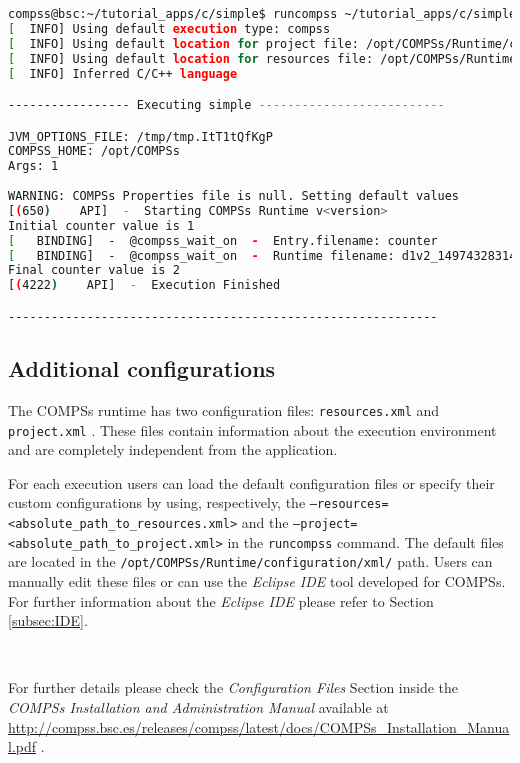 \begin{lstlisting}[language=bash]
compss@bsc:~/tutorial_apps/c/simple$ runcompss ~/tutorial_apps/c/simple/master/simple 1
[  INFO] Using default execution type: compss
[  INFO] Using default location for project file: /opt/COMPSs/Runtime/configuration/xml/projects/default_project.xml
[  INFO] Using default location for resources file: /opt/COMPSs/Runtime/configuration/xml/resources/default_resources.xml
[  INFO] Inferred C/C++ language

----------------- Executing simple --------------------------

JVM_OPTIONS_FILE: /tmp/tmp.ItT1tQfKgP
COMPSS_HOME: /opt/COMPSs
Args: 1
 
WARNING: COMPSs Properties file is null. Setting default values
[(650)    API]  -  Starting COMPSs Runtime v<version>
Initial counter value is 1
[   BINDING]  -  @compss_wait_on  -  Entry.filename: counter
[   BINDING]  -  @compss_wait_on  -  Runtime filename: d1v2_1497432831496.IT
Final counter value is 2
[(4222)    API]  -  Execution Finished

------------------------------------------------------------
\end{lstlisting}


\subsection{Additional configurations}

The COMPSs runtime has two configuration files: \texttt{resources.xml} and \texttt{project.xml} . 
These files contain information about the execution environment and are completely independent from the application.

For each execution users can load the default configuration files or specify their custom configurations 
by using, respectively, the \texttt{--resources=<absolute\_path\_to\_resources.xml>} and the
\texttt{--project=<absolute\_path\_to\_project.xml>} in the \texttt{runcompss} command. The default files are located 
in the \texttt{/opt/COMPSs/Runtime/configuration/xml/} path. 
Users can manually edit these files or can use the \textit{Eclipse IDE} tool developed for COMPSs. For further 
information about the \textit{Eclipse IDE} please refer to Section \ref{subsec:IDE}. 

~\newline

For further details please check the \textit{Configuration Files} Section inside the \textit{COMPSs Installation and Administration Manual}
available at \url{http://compss.bsc.es/releases/compss/latest/docs/COMPSs_Installation_Manual.pdf} .

